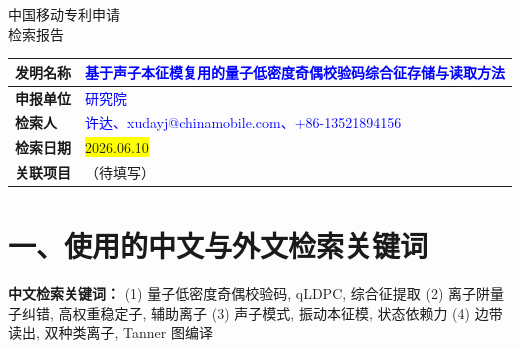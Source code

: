 \documentclass[12pt,a4paper]{article}
\begin{document}
\noindent

\vspace{1em}

\begin{center}
    {\Huge\heiti 中国移动专利申请} \\[0.5em]
    {\Huge\heiti 检索报告} \\[1em]
\end{center}

\begin{table}[h]
    \centering
    \renewcommand{\arraystretch}{2}
    \begin{tabular}{|p{3cm}|p{12cm}|}
        \hline
        \textbf{发明名称} & \textcolor{blue}{基于声子本征模复用的量子低密度奇偶校验码综合征存储与读取方法} \\
        \hline
        \textbf{申报单位} & \textcolor{blue}{研究院} \\
        \hline
        \textbf{检索人} & \textcolor{blue}{许达、xudayj@chinamobile.com、+86-13521894156} \\
        \hline
        \textbf{检索日期} & \colorbox{yellow}{2026.06.10} \\
        \hline
        \textbf{关联项目} & （待填写） \\
        \hline
    \end{tabular}
\end{table}

\vspace{0.5em}

\noindent{}

\vspace{1em}


\section*{一、使用的中文与外文检索关键词}

\textbf{中文检索关键词：}
(1) 量子低密度奇偶校验码, qLDPC, 综合征提取
(2) 离子阱量子纠错, 高权重稳定子, 辅助离子
(3) 声子模式, 振动本征模, 状态依赖力
(4) 边带读出, 双种类离子, Tanner 图编译
\end{document}
